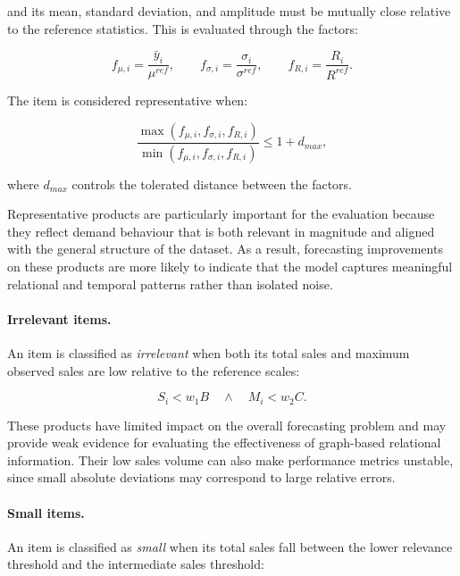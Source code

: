 and its mean, standard deviation, and amplitude must be mutually close relative to the reference statistics. This is evaluated through the factors:

\begin{equation}
    f_{\mu,i} = \frac{\bar{y}_i}{\mu^{ref}},
    \qquad
    f_{\sigma,i} = \frac{\sigma_i}{\sigma^{ref}},
    \qquad
    f_{R,i} = \frac{R_i}{R^{ref}}.
    \label{eq:representative_factors}
\end{equation}

The item is considered representative when:

\begin{equation}
    \frac{
        \max(f_{\mu,i}, f_{\sigma,i}, f_{R,i})
    }{
        \min(f_{\mu,i}, f_{\sigma,i}, f_{R,i})
    }
    \leq 1 + d_{max},
    \label{eq:close_factors_condition}
\end{equation}

where \(d_{max}\) controls the tolerated distance between the factors.

Representative products are particularly important for the evaluation because they reflect demand behaviour that is both relevant in magnitude and aligned with the general structure of the dataset. As a result, forecasting improvements on these products are more likely to indicate that the model captures meaningful relational and temporal patterns rather than isolated noise.

\paragraph{Irrelevant items.}
An item is classified as \textit{irrelevant} when both its total sales and maximum observed sales are low relative to the reference scales:

\begin{equation}
    S_i < w_1 B
    \quad \land \quad
    M_i < w_2 C.
    \label{eq:irrelevant_condition}
\end{equation}

These products have limited impact on the overall forecasting problem and may provide weak evidence for evaluating the effectiveness of graph-based relational information. Their low sales volume can also make performance metrics unstable, since small absolute deviations may correspond to large relative errors.

\paragraph{Small items.}
An item is classified as \textit{small} when its total sales fall between the lower relevance threshold and the intermediate sales threshold:


